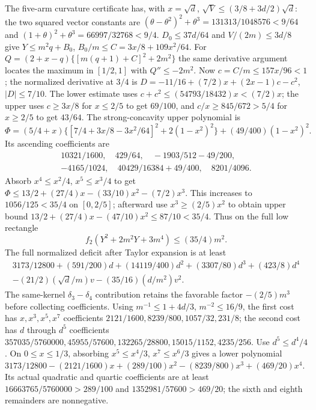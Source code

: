 The five-arm curvature certificate has, with $x=\sqrt d$,
$\sqrt V\le(3/8+3d/2)\sqrt d$:
the two squared vector constants are
$(\theta-\theta^2)^2+\theta^3=131313/1048576<9/64$ and
$(1+\theta)^2+\theta^3=66997/32768<9/4$.
$D_0\le37d/64$ and $V/(2m)\le3d/8$ give
$Y\le m^2q+B_0$, $B_0/m\le C=3x/8+109x^2/64$.
For $Q=(2+x-q)\{[m(q+1)+C]^2+2m^2\}$ the same derivative
argument locates the maximum in $[1/2,1]$ with $Q''\le-2m^2$.
Now $c=C/m\le157x/96<1$; the normalized derivative at $3/4$ is
$D=-11/16+(7/2)x+(2x-1)c-c^2$, $|D|\le7/10$.
The lower estimate uses $c+c^2\le(54793/18432)x<(7/2)x$;
the upper uses $c\ge3x/8$ for $x\le2/5$ to get $69/100$, and
$c/x\ge845/672>5/4$ for $x\ge2/5$ to get $43/64$.
The strong-concavity upper polynomial is
\[
\Phi=(5/4+x)\{[7/4+3x/8-3x^2/64]^2+2(1-x^2)^2\}
+(49/400)(1-x^2)^2.
\]
Its ascending coefficients are
\[
\begin{gathered}
10321/1600,\quad429/64,\quad-1903/512-49/200,\\
-4165/1024,\quad40429/16384+49/400,\quad8201/4096.
\end{gathered}
\]
Absorb $x^4\le x^2/4$, $x^5\le x^3/4$ to get
$\Phi\le13/2+(27/4)x-(33/10)x^2-(7/2)x^3$.
This increases to $1056/125<35/4$ on $[0,2/5]$;
afterward use $x^3\ge(2/5)x^2$ to obtain upper bound
$13/2+(27/4)x-(47/10)x^2\le87/10<35/4$.
Thus on the full low rectangle
\begin{equation}\tag{L69.11.7}\label{eq:L69:fivecurvature}
f_2(Y^2+2m^2Y+3m^4)\le(35/4)m^2.
\end{equation}
The full normalized deficit after Taylor expansion is
at least
\[
\begin{gathered}
3173/12800+(591/200)d+(14119/400)d^2+(3307/80)d^3+(423/8)d^4
\\-(21/2)(\sqrt d/m)v-(35/16)(d/m^2)v^2.
\end{gathered}
\]
The same-kernel $\delta_3-\delta_4$ contribution retains the favorable
factor $-(2/5)m^3$ before collecting coefficients.
Using $m^{-1}\le1+4d/3$, $m^{-2}\le16/9$, the first cost has
$x,x^3,x^5,x^7$ coefficients
$2121/1600,8239/800,1057/32,231/8$; the second cost has
$d$ through $d^5$ coefficients
$357035/5760000,\allowbreak 45955/57600,\allowbreak 132265/28800,\allowbreak 15015/1152,\allowbreak 4235/256$.
Use $d^5\le d^4/4$.
On $0\le x\le1/3$, absorbing $x^5\le x^4/3$, $x^7\le x^6/3$
gives a lower polynomial
$3173/12800-(2121/1600)x+(289/100)x^2-(8239/800)x^3+(469/20)x^4$.
Its actual quadratic and quartic coefficients are at least
$16663765/5760000>289/100$ and $1352981/57600>469/20$;
the sixth and eighth remainders are nonnegative.
